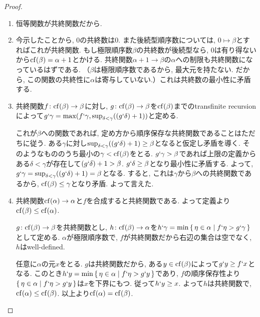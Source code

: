 \documentclass[a4paper, twoside]{bxjsarticle}
\theoremstyle{definition}
\begin{document}
        \begin{proof}
            \begin{enumerate}
                \item 恒等関数が共終関数だから.
                \item 今示したことから, 0の共終数は0. また後続型順序数については, $0\mapsto \beta$とすればこれが共終関数. もし極限順序数$\beta$の共終数が後続型なら, $0$は有り得ないから${\rm cf}(\beta)=\alpha+1$とかける. 共終関数$\alpha+1\to \beta$の$\alpha$への制限も共終関数になっているはずである. （$\beta$は極限順序数であるから, 最大元を持たない. だから, この関数の共終性に$\alpha$は寄与していない.）これは共終数の最小性に矛盾する. 
                
                \item 共終関数$f\colon {\rm cf}(\beta)\to\beta$に対し, $g\colon{\rm cf}(\beta)\to\beta$を${\rm cf}(\beta)$までのtransfinite recursionによって$g`\gamma={\rm max}(f`\gamma, {\rm sup}_{\delta<\gamma}((g`\delta)+1))$と定める.
                
                これが$\beta$への関数であれば, 定め方から順序保存な共終関数であることはただちに従う. ある$\gamma$に対し${\rm sup}_{\delta<\gamma}((g`\delta)+1)\geq\beta$となると仮定し矛盾を導く. そのようなもののうち最小の$\gamma<{\rm cf}(\beta)$をとる. $g`\gamma>\beta$であれば上限の定義からある$\delta<\gamma$が存在して$(g`\delta)+1>\beta$. $g`\delta\geq\beta$となり最小性に矛盾する. よって, $g`\gamma={\rm sup}_{\delta<\gamma}((g`\delta)+1)=\beta$となる. すると, これは$\gamma$から$\beta$への共終関数であるから, ${\rm cf}(\beta)\leq\gamma$となり矛盾. よって言えた. 
                
                \item 共終関数${\rm cf}(\alpha)\to \alpha$と$f$を合成すると共終関数である. よって定義より${\rm cf}(\beta)\leq{\rm cf}(\alpha)$. 
                
                $g\colon {\rm cf}(\beta)\to\beta$を共終関数とし, $h\colon {\rm cf}(\beta)\to\alpha$を$h`\gamma = {\rm min}\set{\eta\in\alpha|f`\eta>g`\gamma}$として定める. $\alpha$が極限順序数で, $f$が共終関数だから右辺の集合は空でなく, $h$はwell-defined.
                
                任意に$\alpha$の元$x$をとる. $g$は共終関数だから, ある$y\in{\rm cf}(\beta)$によって$g`y\geq f`x$となる. このとき$h`y={\rm min}\set{\eta\in\alpha|f`\eta>g`y}$であり, $f$の順序保存性より$\set{\eta\in\alpha|f`\eta>g`y}$は$x$を下界にもつ. 従って$h`y\geq x$. よって$h$は共終関数で, ${\rm cf}(\alpha)\leq{\rm cf}(\beta)$. 以上より${\rm cf}(\alpha)={\rm cf}(\beta)$.
                

\end{enumerate}
\end{proof}
\end{document}
